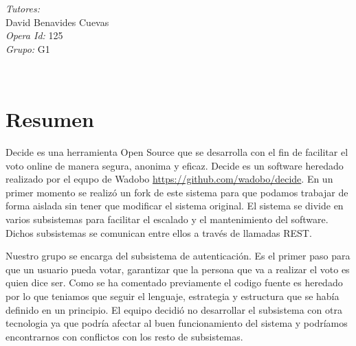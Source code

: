 \documentclass[12pt]{article}
\begin{document}
\begin{titlepage}
\begin{minipage}{0.4\textwidth}
			\begin{flushright} \large
			\emph{Tutores:} \\
			David Benavides Cuevas\\
            \emph{Opera Id: }
            125\\
			\emph{Grupo: }            
            G1\\
            
            
		\end{flushright}
        
	\end{minipage}\\[2 cm]
	
	
    
    
    
    
	
\end{titlepage}


\tableofcontents
\pagebreak


\section{Resumen}
Decide es una herramienta Open Source que se desarrolla con el fin de facilitar el voto online de manera segura, anonima y eficaz. Decide es un software heredado realizado por el equpo de Wadobo \url{https://github.com/wadobo/decide}.
En un primer momento se realizó un fork de este sistema para que podamos trabajar de forma aislada sin tener que modificar el sistema original.
El sistema se divide en varios subsistemas para facilitar el escalado y el mantenimiento del software. Dichos subsistemas se comunican entre ellos a través de llamadas REST.  


Nuestro grupo se encarga del subsistema de autenticación. Es el primer paso  para que un usuario pueda votar, garantizar que la persona que va a realizar el voto es quien dice ser. Como se ha comentado previamente el codigo fuente es heredado por lo que teniamos que seguir el lenguaje, estrategia y estructura que se había definido en un principio. El equipo decidió no desarrollar el subsistema con otra tecnologia ya que podría afectar al buen funcionamiento del sistema y podríamos encontrarnos con conflictos con los resto de subsistemas.  
\end{document}
